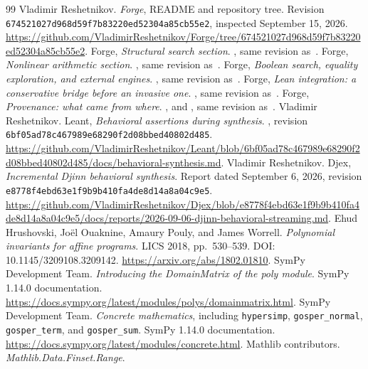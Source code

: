 \documentclass[11pt,letterpaper]{article}
\newcommand{\code}[1]{\texttt{#1}}
\theoremstyle{definition}\newtheorem{definition}[theorem]{Definition}
\theoremstyle{remark}\newtheorem{remark}[theorem]{Remark}
\begin{document}
\begin{thebibliography}{99}
\small
{} Vladimir Reshetnikov. \emph{Forge}, README and repository tree.
Revision \nolinkurl{674521027d968d59f7b83220ed52304a85cb55e2}, inspected September
15, 2026. \url{https://github.com/VladimirReshetnikov/Forge/tree/674521027d968d59f7b83220ed52304a85cb55e2}.
 Forge, \emph{Structural search section}. , same revision
as~\cite{forge}.
 Forge, \emph{Nonlinear arithmetic section}. , same
revision as~\cite{forge}.
 Forge, \emph{Boolean search, equality exploration, and
external engines}. , same
revision as~\cite{forge}.
 Forge, \emph{Lean integration: a conservative bridge
before an invasive one}. , same
revision as~\cite{forge}.
 Forge, \emph{Provenance: what came from where}.
, and
, same revision as~\cite{forge}.
 Vladimir Reshetnikov. Leant, \emph{Behavioral assertions
during synthesis}. , revision
\nolinkurl{6bf05ad78c467989e68290f2d08bbed40802d485}.
\url{https://github.com/VladimirReshetnikov/Leant/blob/6bf05ad78c467989e68290f2d08bbed40802d485/docs/behavioral-synthesis.md}.
 Vladimir Reshetnikov. Djex, \emph{Incremental Djinn
behavioral synthesis}. Report dated September 6, 2026, revision
\nolinkurl{e8778f4ebd63e1f9b9b410fa4de8d14a8a04c9e5}.
\url{https://github.com/VladimirReshetnikov/Djex/blob/e8778f4ebd63e1f9b9b410fa4de8d14a8a04c9e5/docs/reports/2026-09-06-djinn-behavioral-streaming.md}.
 Ehud Hrushovski, Jo\"el Ouaknine, Amaury Pouly, and
James Worrell. \emph{Polynomial invariants for affine programs}. LICS 2018,
pp.~530--539. DOI: 10.1145/3209108.3209142.
\url{https://arxiv.org/abs/1802.01810}.
 SymPy Development Team. \emph{Introducing the
DomainMatrix of the poly module}. SymPy 1.14.0 documentation.
\url{https://docs.sympy.org/latest/modules/polys/domainmatrix.html}.
 SymPy Development Team. \emph{Concrete mathematics},
including \code{hypersimp}, \code{gosper\_normal}, \code{gosper\_term}, and
\code{gosper\_sum}. SymPy 1.14.0 documentation.
\url{https://docs.sympy.org/latest/modules/concrete.html}.
 Mathlib contributors. \emph{Mathlib.Data.Finset.Range}.

\end{thebibliography}
\end{document}
